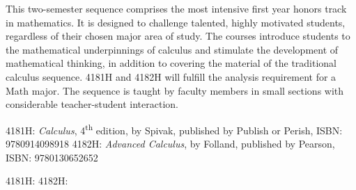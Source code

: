 \documentclass{osucourse}
\begin{document}
\CatalogDescription
\PrerequisitesAndExclusions

\begin{Purpose}
This two-semester sequence comprises the most intensive first year honors track in mathematics. It is designed to challenge talented, highly motivated students, regardless of their chosen major area of study. The courses introduce students to the mathematical underpinnings of calculus and stimulate the development of mathematical thinking, in addition to covering the material of the traditional calculus sequence. 4181H and 4182H will fulfill the analysis requirement for a Math major. The sequence is taught by faculty members in small sections with considerable teacher-student interaction.
\end{Purpose}

\begin{Text}
4181H: \emph{Calculus}, 4\textsuperscript{th} edition, by Spivak, published by Publish or Perish, ISBN: 9780914098918 4182H: \emph{Advanced Calculus}, by Folland, published by Pearson, ISBN: 9780130652652
\end{Text}

\begin{TopicsOutline}
4181H:
4182H:
\end{TopicsOutline}
\end{document}
